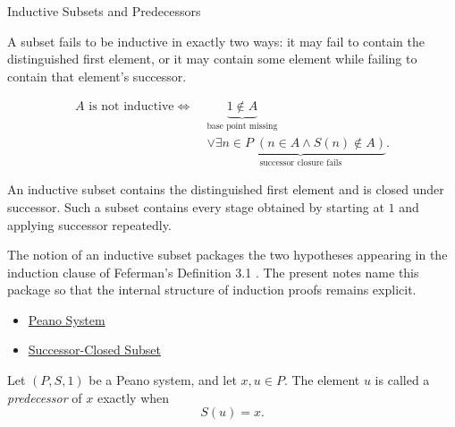 \begin{topicbox}{Inductive Subsets and Predecessors}
\begin{remark*}
A subset fails to be inductive in exactly two ways: it may fail to contain the
distinguished first element, or it may contain some element while failing to
contain that element's successor.
\end{remark*}

\begin{remark*}
\[
\begin{aligned}
A \text{ is not inductive}
\Longleftrightarrow\;&
\underbrace{1 \notin A}_{\text{base point missing}}\\
&\lor
\underbrace{\exists n \in P\;(n \in A \land S(n) \notin A)}_{\text{successor closure fails}}.
\end{aligned}
\]
\end{remark*}

\begin{remark*}[Interpretation]
An inductive subset contains the distinguished first element and is closed
under successor. Such a subset contains every stage obtained by starting at
$1$ and applying successor repeatedly.
\end{remark*}

\begin{remark*}
The notion of an inductive subset packages the two hypotheses appearing in the
induction clause of Feferman's Definition 3.1
\citep{FefermanNumberSystems1964}. The present notes name this package so
that the internal structure of induction proofs remains explicit.
\end{remark*}

\begin{dependencies}
\begin{itemize}
  \item \hyperref[def:peano-system]{Peano System}
  \item \hyperref[def:successor-closed-subset]{Successor-Closed Subset}
\end{itemize}
\end{dependencies}

\begin{tcolorbox}[colback=defbox, colframe=defborder, arc=2pt,
  left=6pt, right=6pt, top=4pt, bottom=4pt,
  title={\small\textbf{Definition (Predecessor in a Peano System)}} ,
  fonttitle=\small\bfseries]
\begin{definition}
\label{def:predecessor-in-peano-system}
Let $(P,S,1)$ be a Peano system, and let $x,u \in P$. The element $u$ is
called a \emph{predecessor} of $x$ exactly when
\[
S(u)=x.
\]
\end{definition}
\end{tcolorbox}


\end{topicbox}
